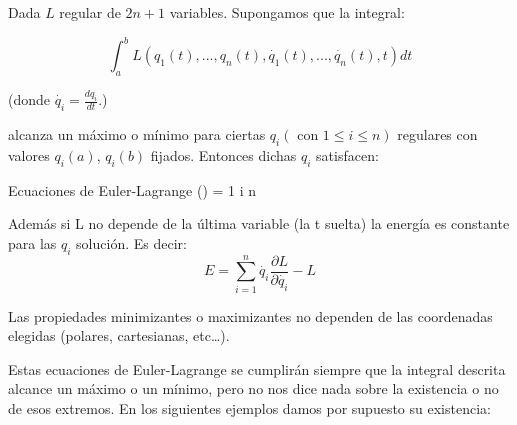 \begin{prop}
Dada $L$ regular de $2n + 1$ variables. Supongamos que la integral:

 $$\int_a^b L(q_1(t),...,q_n(t),\dot{q_1}(t),...,\dot{q_n}(t),t) dt$$

 (donde $\dot{q_i} = \frac{dq_i}{dt}$.)

 alcanza un máximo o mínimo para ciertas $q_i (\text{ con } 1\leq i \leq n)$ regulares con valores $q_i(a)$, $q_i(b)$ fijados. Entonces dichas $q_i$ satisfacen:


\begin{op}{Ecuaciones de Euler-Lagrange}
 \left(\right) =   1 \leq i \leq n
\end{op}

Además si L no depende de la última variable (la t suelta) la energía es constante para las $q_i$ solución. Es decir:
\[E = \sum_{i=1}^n \dot{q_i} \frac{\partial L}{\partial \dot{q_i}} - L\]

Las propiedades minimizantes o maximizantes no dependen de las coordenadas elegidas (polares, cartesianas, etc…).

\end{prop}

Estas ecuaciones de Euler-Lagrange se cumplirán siempre que la integral descrita alcance un máximo o un mínimo, pero no nos dice nada sobre la existencia o no de esos extremos. En los  siguientes ejemplos damos por supuesto su existencia:

